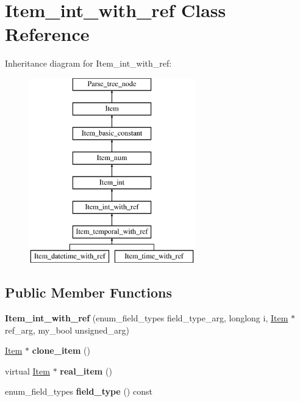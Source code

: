 \hypertarget{classItem__int__with__ref}{}\section{Item\+\_\+int\+\_\+with\+\_\+ref Class Reference}
\label{classItem__int__with__ref}
Inheritance diagram for Item\+\_\+int\+\_\+with\+\_\+ref\+:\begin{figure}[H]
\begin{center}
\leavevmode
\includegraphics[height=8.000000cm]{classItem__int__with__ref}
\end{center}
\end{figure}
\subsection*{Public Member Functions}
\begin{DoxyCompactItemize}
\item 
\mbox{\label{classItem__int__with__ref_af0a6d2f5ee9bc5f6a87719a95ffada92}} 
{\bfseries Item\+\_\+int\+\_\+with\+\_\+ref} (enum\+\_\+field\+\_\+types field\+\_\+type\+\_\+arg, longlong i, \mbox{\hyperlink{classItem}{Item}} $\ast$ref\+\_\+arg, my\+\_\+bool unsigned\+\_\+arg)
\item 
\mbox{\label{classItem__int__with__ref_af8f51b2afadcdbcedfbf03754369c96c}} 
\mbox{\hyperlink{classItem}{Item}} $\ast$ {\bfseries clone\+\_\+item} ()
\item 
\mbox{\label{classItem__int__with__ref_a3a12e419a8bc426c17172ac759ed2364}} 
virtual \mbox{\hyperlink{classItem}{Item}} $\ast$ {\bfseries real\+\_\+item} ()
\item 
\mbox{\label{classItem__int__with__ref_af272b8c99af4b333e18b01a555afa4e8}} 
enum\+\_\+field\+\_\+types {\bfseries field\+\_\+type} () const
\end{DoxyCompactItemize}
